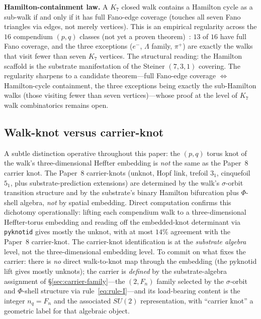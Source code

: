 \documentclass[11pt]{article}
\begin{document}
\textbf{Hamilton-containment law.}  A $K_7$ closed walk contains a Hamilton cycle as a sub-walk if and only if it has full Fano-edge coverage (touches all seven Fano triangles via edges, not merely vertices).  This is an empirical regularity across the $16$ compendium $(p, q)$ classes (not yet a proven theorem)~\cite{k7-hamilton-cycle-taxonomy}: $13$ of $16$ have full Fano coverage, and the three exceptions ($e^-$, $\Lambda$ family, $\pi^+$) are exactly the walks that visit fewer than seven $K_7$ vertices.  The structural reading: the Hamilton scaffold is the substrate manifestation of the Steiner $(7, 3, 1)$ covering.  The regularity sharpens to a candidate theorem---full Fano-edge coverage $\Leftrightarrow$ Hamilton-cycle containment, the three exceptions being exactly the sub-Hamilton walks (those visiting fewer than seven vertices)---whose proof at the level of $K_7$ walk combinatorics remains open.

\subsection{Walk-knot versus carrier-knot}
\label{sec:walk-knot-vs-carrier-knot}

A subtle distinction operative throughout this paper: the $(p, q)$ torus knot of the walk's three-dimensional Heffter embedding is \emph{not} the same as the Paper~8 carrier knot.  The Paper~8 carrier-knots (unknot, Hopf link, trefoil $3_1$, cinquefoil $5_1$, plus substrate-prediction extensions) are determined by the walk's $\sigma$-orbit transition structure and by the substrate's binary Hamilton bifurcation plus $\Phi$-shell algebra, \emph{not} by spatial embedding.  Direct computation confirms this dichotomy operationally: lifting each compendium walk to a three-dimensional Heffter-torus embedding and reading off the embedded-knot determinant via \texttt{pyknotid} gives mostly the unknot, with at most $14\%$ agreement with the Paper~8 carrier-knot.  The carrier-knot identification is at the \emph{substrate algebra} level, not the three-dimensional embedding level.  To commit on what fixes the carrier: there is \emph{no} direct walk-to-knot map through the embedding (the pyknotid lift gives mostly unknots); the carrier is \emph{defined} by the substrate-algebra assignment of \S\ref{sec:carrier-family}---the $(2, F_n)$ family selected by the $\sigma$-orbit and $\Phi$-shell structure via rule~\eqref{eq:rule-I}---and its load-bearing content is the integer $n_q = F_n$ and the associated $SU(2)$ representation, with ``carrier knot'' a geometric label for that algebraic object.
\end{document}
